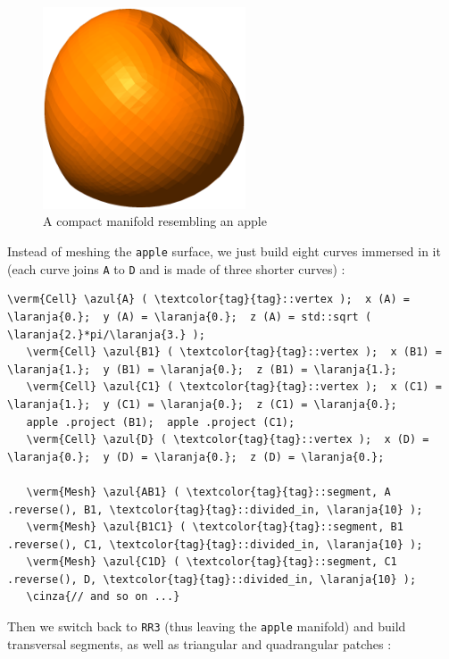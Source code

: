 \begin{figure}[ht] \centering
  \includegraphics[width=60mm]{fisalis-manif}
  \caption{A compact manifold resembling an apple}
  \label{\numb section 2.\numb fig 14}
\end{figure}

Instead of meshing the {\small\tt apple} surface, we just build eight curves immersed in it
(each curve joins {\small\tt A} to {\small\tt D} and is made of three shorter curves) :

\begin{Verbatim}[commandchars=\\\{\},formatcom=\small\tt,frame=single,
   label=parag-\ref{\numb section 2.\numb parag 13}.cpp,rulecolor=\color{coment},
   baselinestretch=0.94,framesep=2mm]
   \verm{Cell} \azul{A} ( \textcolor{tag}{tag}::vertex );  x (A) = \laranja{0.};  y (A) = \laranja{0.};  z (A) = std::sqrt ( \laranja{2.}*pi/\laranja{3.} );
   \verm{Cell} \azul{B1} ( \textcolor{tag}{tag}::vertex );  x (B1) = \laranja{1.};  y (B1) = \laranja{0.};  z (B1) = \laranja{1.};
   \verm{Cell} \azul{C1} ( \textcolor{tag}{tag}::vertex );  x (C1) = \laranja{1.};  y (C1) = \laranja{0.};  z (C1) = \laranja{0.};
   apple .project (B1);  apple .project (C1);
   \verm{Cell} \azul{D} ( \textcolor{tag}{tag}::vertex );  x (D) = \laranja{0.};  y (D) = \laranja{0.};  z (D) = \laranja{0.};

   \verm{Mesh} \azul{AB1} ( \textcolor{tag}{tag}::segment, A .reverse(), B1, \textcolor{tag}{tag}::divided_in, \laranja{10} );
   \verm{Mesh} \azul{B1C1} ( \textcolor{tag}{tag}::segment, B1 .reverse(), C1, \textcolor{tag}{tag}::divided_in, \laranja{10} );
   \verm{Mesh} \azul{C1D} ( \textcolor{tag}{tag}::segment, C1 .reverse(), D, \textcolor{tag}{tag}::divided_in, \laranja{10} );
   \cinza{// and so on ...}
\end{Verbatim}

Then we switch back to {\small\tt RR3} (thus leaving the {\small\tt apple} manifold) and build
transversal segments, as well as triangular and quadrangular patches :

